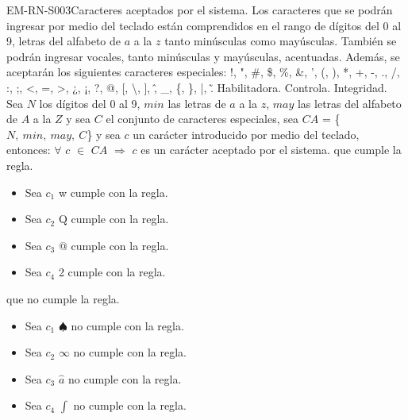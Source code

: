 \begin{BussinesRule}{EM-RN-S003}{Caracteres aceptados por el sistema.} 
	\BRitem[Descripción:] Los caracteres que se podrán ingresar por medio del teclado están comprendidos en 
	el rango de dígitos del 0 al 9, letras del alfabeto de $a$ a la $z$ tanto minúsculas como mayúsculas. 
	También se podrán ingresar vocales, tanto minúsculas y mayúsculas, acentuadas.
	Además, se aceptarán los siguientes caracteres especiales:
	!, ", \#, \$, \%, \&, ', (, ), *, +, -, ., /, :, ;, <, =, >, ¿, ¡, ?, @, [, \textbackslash,
	], \^, \_, \{, \}, |, \~.
	\BRitem[Tipo:] Habilitadora.
	\BRitem[Nivel:] Controla.
	\BRitem[Calse:] Integridad.
	\BRitem[Sentencia:] 
	Sea $N$ los dígitos del 0 al 9, $min$ las letras de $a$ a la $z$, $may$ las letras del
	alfabeto de $A$ a la $Z$ y sea $C$ el conjunto de caracteres especiales, sea 
	$CA$ = \{$ N, \:min, \:may, \:C $\} y sea $c$ un carácter introducido por medio del teclado, entonces:
	\newline
	$\forall$ $c$  $\in$ $CA$ $\Rightarrow$ $c$ es un carácter aceptado por el sistema.
	 que cumple la regla.
		\begin{itemize}
			\item Sea $c_{1}$ w cumple con la regla.
			\item Sea $c_{2}$ Q cumple con la regla.
			\item Sea $c_{3}$ @ cumple con la regla.
			\item Sea $c_{4}$ 2 cumple con la regla.
		\end{itemize}
	 que no cumple la regla.
		\begin{itemize}
			\item Sea $c_{1}$ $\spadesuit$ no cumple con la regla.
			\item Sea $c_{2}$ $\infty$ no cumple con la regla.
			\item Sea $c_{3}$ $\hat{a}$ no cumple con la regla.
			\item Sea $c_{4}$ $\int$ no cumple con la regla.
		\end{itemize}
\end{BussinesRule}


